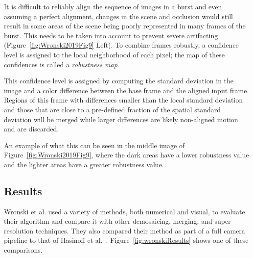 \documentclass{sig-alternate}
\begin{document}
 
It is difficult to reliably align the sequence of images in a burst and even assuming a perfect alignment, changes in the scene and occlusion would still result in some areas of the scene being poorly represented in many frames of the burst. This needs to be taken into account to prevent severe artifacting (Figure~\ref{fig:Wronski2019Fig9} Left). To combine frames robustly, a confidence level is assigned to the local neighborhood of each pixel; the map of these confidences is called a \emph{robustness map}.

This confidence level is assigned by computing the standard deviation in the image and a color difference between the base frame and the aligned input frame. Regions of this frame with differences smaller than the local standard deviation and those that are close to a pre-defined fraction of the spatial standard deviation will be merged while larger differences are likely non-aligned motion and are discarded.

An example of what this can be seen in the middle image of Figure~\ref{fig:Wronski2019Fig9}, where the dark areas have a lower robustness value and the lighter areas have a greater robustness value.

\subsection{Results}



Wronski et al. used a variety of methods, both numerical and visual, to evaluate their algorithm and compare it with other demosaicing, merging, and super-resolution techniques. They also compared their method as part of a full camera pipeline to that of Hasinoff et al.~\cite{Hasinoff2016}. Figure~\ref{fig:wronskiResults} shows one of these comparisons.
\end{document}
